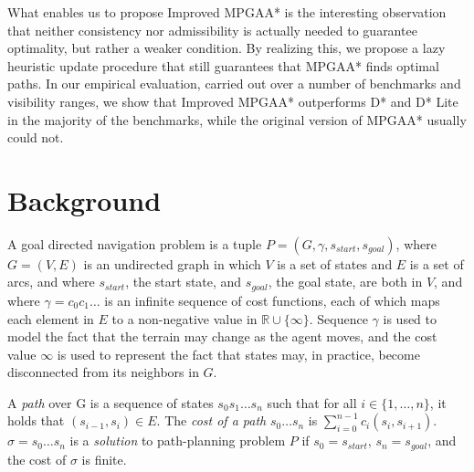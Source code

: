 \documentclass{article}
\newcommand{\sstart}{\ensuremath{s_{\mathit{start}}}\xspace}
\newcommand{\sgoal}{\ensuremath{s_{\mathit{goal}}}\xspace}
\begin{document}
What enables us to propose Improved MPGAA* is the interesting observation that neither consistency nor admissibility is actually needed to guarantee optimality, but rather a weaker condition. By realizing this, we propose a lazy heuristic update procedure that still guarantees that MPGAA* finds optimal paths. In our empirical evaluation, carried out over a number of benchmarks and visibility ranges, we show that Improved MPGAA* outperforms D* and D* Lite in the majority of the benchmarks, while the original version of MPGAA* usually could not.






\section{Background}
A goal directed navigation problem is a tuple
$P=(G,\gamma,\sstart,\sgoal)$, where $G=(V,E)$ is an undirected graph
in which $V$ is a set of states and $E$ is a set of arcs, and where
$\sstart$, the start state, and $\sgoal$, the goal state, are both in
$V$, and where $\gamma=c_0c_1\ldots$ is an infinite sequence of cost
functions, each of which maps each element in $E$ to a non-negative
value in $\mathbb{R}\cup\{\infty\}$. Sequence $\gamma$ is used to
model the fact that the terrain may change as the agent moves, and the
cost value $\infty$ is used to represent the fact that states may, in
practice, become disconnected from its neighbors in $G$.

A \emph{path} over G is a
sequence of states $s_0s_1\ldots s_n$ such that for all
$i\in\{1,\ldots,n\}$, it holds that $(s_{i-1},s_i)\in E$. The
\emph{cost of a path} $s_0\ldots s_n$ is 
$\sum_{i=0}^{n-1} c_i(s_i,s_{i+1})$.
$\sigma=s_0\ldots s_n$ is a \emph{solution} to path-planning problem
$P$ if $s_0=\sstart$, $s_n=\sgoal$, and the cost of $\sigma$ is
finite.
\end{document}
